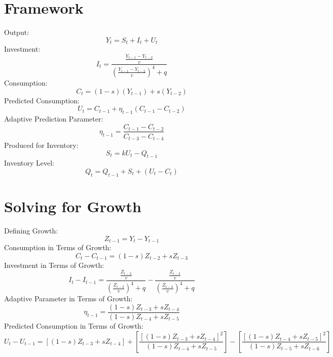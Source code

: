 \documentclass[]{article}
\begin{document}
\section{Framework}
\noindent Output: 
	\begin{equation}
	Y_t = S_t + I_t + U_t 
	\end{equation}
Investment: 
	\begin{equation}
		I_t = \frac{\frac{Y_{t-1}-Y_{t-2}}{v}}{(\frac{Y_{t-1}-Y_{t-2}}{v})^4+q}	
	\end{equation}
Consumption:
	\begin{equation}
		C_t = (1-s)(Y_{t-1}) + s(Y_{t-2})
	\end{equation}
Predicted Consumption:
	\begin{equation}
		U_t = C_{t-1} + \eta_{t-1} (C_{t-1} - C_{t-2})
	\end{equation}
Adaptive Prediction Parameter:
	\begin{equation}
		\eta_{t-1} = \frac{C_{t-1}-C_{t-2}}{C_{t-3}-C_{t-4}}
	\end{equation}
Produced for Inventory:
	\begin{equation}
		S_t = kU_t - Q_{t-1}
	\end{equation}
Inventory Level:
	\begin{equation}
		Q_t = Q_{t-1} + S_t + (U_t-C_t)
	\end{equation}
\section{Solving for Growth}
\noindent Defining Growth:
	\begin{equation}
		Z_{t-1}=Y_t-Y_{t-1}
	\end{equation}
Consumption in Terms of Growth:
	\begin{equation}
		C_t-C_{t-1}=(1-s)Z_{t-2}+sZ_{t-3}
	\end{equation}
Investment in Terms of Growth:
	\begin{equation}
		I_t-I_{t-1}=\frac{\frac{Z_{t-2}}{v}}{\left(\frac{Z_{t-2}}{v}\right)^4+q}-\frac{\frac{Z_{t-3}}{v}}{\left(\frac{Z_{t-3}}{v}\right)^4+q}
	\end{equation}
Adaptive Parameter in Terms of Growth:
	\begin{equation}
		\eta_{t-1}=\frac{(1-s)Z_{t-3}+sZ_{t-4}}{(1-s)Z_{t-4}+sZ_{t-5}}
	\end{equation}
Predicted Consumption in Terms of Growth:
	\begin{equation}
		U_t-U_{t-1}=[(1-s)Z_{t-3}+sZ_{t-4}]+\left[\frac{[(1-s)Z_{t-3}+sZ_{t-4}]^2}{(1-s)Z_{t-4}+sZ_{t-5}}\right]-\left[\frac{[(1-s)Z_{t-4}+sZ_{t-5}]^2}{(1-s)Z_{t-5}+sZ_{t-6}}\right]
	\end{equation}
\end{document}
